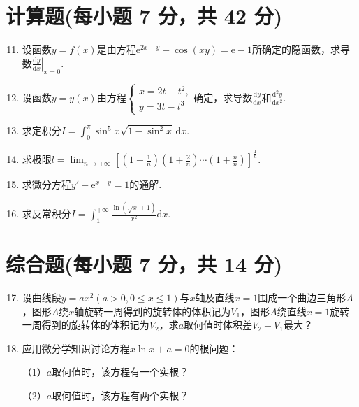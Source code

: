 \documentclass[../main.tex]{subfiles}
\begin{document}
\section{计算题(每小题 7 分，共 42 分)}
\begin{enumerate}
    \setcounter{enumi}{10}
    \item 设函数$y=f(x)$是由方程$\mathrm{e}^{2x+y}-\cos(xy)=\mathrm{e}-1$所确定的隐函数，求导数$\left
              .\frac{\mathrm{d}y}{\mathrm{d}x}\right|_{x=0}$.
          \vspace{11em}

    \item 设函数$y=y(x)$由方程$\begin{cases}
                  x=2t-t^{2}, \\
                  y=3t-t^{3}
              \end{cases}$确定，求导数$\frac{\mathrm{d}y}{\mathrm{d}x}$和$\frac{\mathrm{d}^{2}
                  y}{\mathrm{d}x^{2}}$.
          \vspace{12em}

    \item 求定积分$I=\int_{0}^{\pi}\sin^{5} x\sqrt{1-\sin^{2} x}\,\mathrm{d}x$.
          \vspace{11em}

    \item 求极限$l=\lim_{n\to+\infty}\left[\left(1+\frac{1}{n}\right)\left(1
                  +\frac{2}{n}\right)\cdots\left(1+\frac{n}{n}\right)\right]^{\frac{1}{n}}$.
          \vspace{11em}

    \item 求微分方程$y'-\mathrm{e}^{x-y}=1$的通解.
          \vspace{12em}

    \item 求反常积分$I=\int_{1}^{+\infty}\frac{\ln\left(\sqrt{x}+1\right)}{x^{2}}
              \mathrm{d}x$.
          \vspace{12em}
\end{enumerate}

\section{综合题(每小题 7 分，共 14 分)}
\begin{enumerate}
    \setcounter{enumi}{16}
    \item 设曲线段$y=ax^{2}(a>0,0\leq x\leq 1)$与$x$轴及直线$x=1$围成一个曲边三角形$A$，图形$A$绕$x$轴旋转一周得到的旋转体的体积记为$V
                  _{1}$，图形$A$绕直线$x=1$旋转一周得到的旋转体的体积记为$V_{2}$，求$a$取何值时体积差$V
                  _{2}-V_{1}$最大？
          \vspace{12em}

    \item 应用微分学知识讨论方程$x\ln x+a=0$的根问题：

          （1）$a$取何值时，该方程有一个实根？

          （2）$a$取何值时，该方程有两个实根？
          \vspace{12em}
\end{enumerate}
\end{document}
